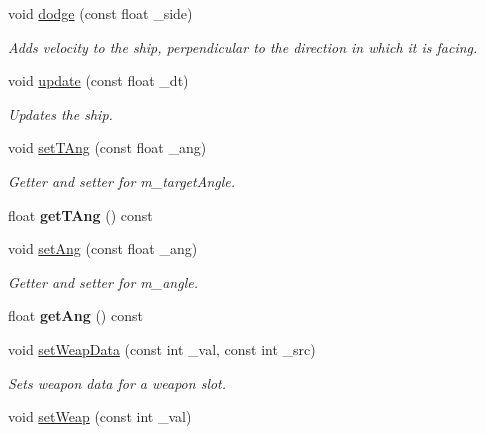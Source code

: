 \begin{DoxyCompactItemize}
void \hyperlink{classship_a2e0ef103ac673f4cce05a364a1d5332e}{dodge} (const float \-\_\-side)
\begin{DoxyCompactList}\small\item\em Adds velocity to the ship, perpendicular to the direction in which it is facing. \end{DoxyCompactList}\item 
void \hyperlink{classship_a17c6d50f754a9d6466d315e74c8245dc}{update} (const float \-\_\-dt)
\begin{DoxyCompactList}\small\item\em Updates the ship. \end{DoxyCompactList}\item 
\hypertarget{classship_a85bbae8598da6aff13de499977174390}{void \hyperlink{classship_a85bbae8598da6aff13de499977174390}{set\-T\-Ang} (const float \-\_\-ang)}\label{classship_a85bbae8598da6aff13de499977174390}

\begin{DoxyCompactList}\small\item\em Getter and setter for m\-\_\-target\-Angle. \end{DoxyCompactList}\item 
\hypertarget{classship_abc03617c92eb7c1a3c818749681fec5c}{float {\bfseries get\-T\-Ang} () const }\label{classship_abc03617c92eb7c1a3c818749681fec5c}

\item 
\hypertarget{classship_a0b5042369840df23927f796b83ccde29}{void \hyperlink{classship_a0b5042369840df23927f796b83ccde29}{set\-Ang} (const float \-\_\-ang)}\label{classship_a0b5042369840df23927f796b83ccde29}

\begin{DoxyCompactList}\small\item\em Getter and setter for m\-\_\-angle. \end{DoxyCompactList}\item 
\hypertarget{classship_a43ce3e315c632d9fc13ea0b18b70b159}{float {\bfseries get\-Ang} () const }\label{classship_a43ce3e315c632d9fc13ea0b18b70b159}

\item 
void \hyperlink{classship_af16bf57c238b48028a8ca6a5d5aad5c1}{set\-Weap\-Data} (const int \-\_\-val, const int \-\_\-src)
\begin{DoxyCompactList}\small\item\em Sets weapon data for a weapon slot. \end{DoxyCompactList}\item 
\hypertarget{classship_a0b07c591c7fe869ef35b9d21dc774ead}{void \hyperlink{classship_a0b07c591c7fe869ef35b9d21dc774ead}{set\-Weap} (const int \-\_\-val)}\label{classship_a0b07c591c7fe869ef35b9d21dc774ead}


\end{DoxyCompactItemize}
